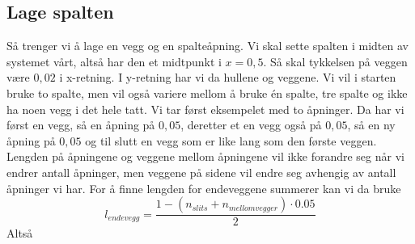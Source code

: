 \documentclass[reprint,english,notitlepage]{revtex4-2}  %
\begin{document}
\subsection{Lage spalten}
Så trenger vi å lage en vegg og en spalteåpning. Vi skal sette spalten i midten av systemet vårt, altså har den et midtpunkt i $x=0,5$. Så skal tykkelsen på veggen være $0,02$ i x-retning. I y-retning har vi da hullene og veggene. Vi vil i starten bruke to spalte, men vil også variere mellom å bruke én spalte, tre spalte og ikke ha noen vegg i det hele tatt. Vi tar først eksempelet med to åpninger. Da har vi først en vegg, så en åpning på $0,05$, deretter et en vegg også på $0,05$, så en ny åpning på $0,05$ og til slutt en vegg som er like lang som den første veggen. Lengden på åpningene og veggene mellom åpningene vil ikke forandre seg når vi endrer antall åpninger, men veggene på sidene vil endre seg avhengig av antall åpninger vi har. For å finne lengden for endeveggene summerer kan vi da bruke
$$
l_{endevegg}=\frac{1-(n_{slits}+n_{mellomvegger})\cdot 0.05}{2}
$$
Altså 
\end{document}

